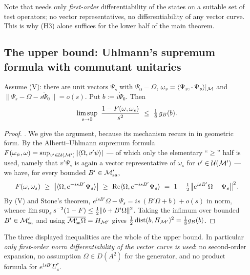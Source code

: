 Note that  needs only \emph{first-order} differentiability of the states on a suitable
set of test operators; no vector representatives, no differentiability of any vector curve.  This is why
(H3) alone suffices for the lower half of the main theorem.

\subsection{The upper bound: Uhlmann's supremum formula with commutant unitaries}

\begin{theorem}[Uhlmann]\label{thm:uhlmann}
Assume \textup{(V)}: there are unit vectors $\Psi_{s}$ with $\Psi_{0}=\Omega$,
$\omega_{s}=\langle\Psi_{s},\cdot\,\Psi_{s}\rangle|_{\mathcal M}$ and
$\|\Psi_{s}-\Omega-s\dot\Psi_{0}\|=o(s)$.  Put $b:=i\dot\Psi_{0}$.  Then
\begin{equation}\label{eq:uhlbound}
 \limsup_{s\to0}\ \frac{1-\Fid(\omega,\omega_{s})}{s^{2}}\ \le\ \tfrac18\,\gB(b).
\end{equation}
\end{theorem}

\begin{proof}
\cite[Theorem ``Lower bound'']{RigorSV}.  We give the argument, because its mechanism recurs in
 in geometric form.  By the Alberti--Uhlmann supremum formula
$F(\omega_{\psi},\omega)=\sup_{v'\in\mathcal U(\mathcal M')}|\langle\Omega,v'\psi\rangle|$
\cite[Theorem 2(3)]{AU02} --- of which only the elementary ``$\ge$'' half is used, namely that
$v'\Psi_{s}$ is again a vector representative of $\omega_{s}$ for $v'\in\mathcal U(\mathcal M')$ --- we have, for every
bounded $B'\in\mathcal M'_{\rm sa}$,
\[
 \Fid(\omega,\omega_{s})\ \ge\ \bigl|\langle\Omega,e^{-isB'}\Psi_{s}\rangle\bigr|
 \ \ge\ \operatorname{Re}\langle\Omega,e^{-isB'}\Psi_{s}\rangle
 \ =\ 1-\tfrac12\bigl\|e^{isB'}\Omega-\Psi_{s}\bigr\|^{2}.
\]
By (V) and Stone's theorem, $e^{isB'}\Omega-\Psi_{s}=is\,(B'\Omega+b)+o(s)$ in norm, whence
$\limsup_{s}s^{-2}(1-F)\le\tfrac12\|b+B'\Omega\|^{2}$.  Taking the infimum over bounded
$B'\in\mathcal M'_{\rm sa}$ and using $\overline{\mathcal M'_{\rm sa}\Omega}=H_{\mathcal M'}$ gives
$\tfrac12\operatorname{dist}(b,H_{\mathcal M'})^{2}=\tfrac18g_{B}(b)$.
\end{proof}

The three displayed inequalities are the whole of the upper bound.  In particular \emph{only first-order
norm differentiability of the vector curve is used}: no second-order expansion, no assumption
$\Omega\in D(A^{2})$ for the generator, and no product formula for $e^{isB'}U_{s}^{*}$.

